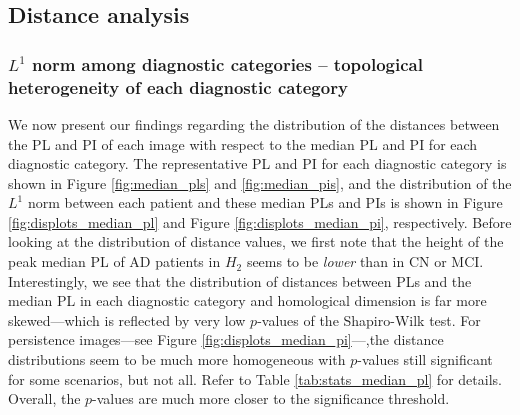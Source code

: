 \documentclass{article}
\begin{document}
\subsection{Distance analysis}

\subsubsection{$L^1$ norm among diagnostic categories -- topological
  heterogeneity of each diagnostic category}\label{sec:results_between_images}

We now present our findings regarding the distribution of the distances between the PL and PI of
each image with respect to the median PL and PI for each diagnostic category. The representative PL
and PI for each diagnostic category is shown in Figure \ref{fig:median_pls} and
\ref{fig:median_pis}, and the distribution of the $L^1$ norm between each patient and these median
PLs and PIs is shown in Figure \ref{fig:displots_median_pl} and Figure \ref{fig:displots_median_pi},
respectively. Before looking at the distribution of distance values, we first note that the height of the peak median PL of AD patients in
$H_2$ seems to be \emph{lower} than in CN or MCI. Interestingly, we see that the distribution of distances between PLs and the median PL
in each diagnostic category and homological dimension is far more skewed---which is reflected by very low
$p$-values of the Shapiro-Wilk test. For persistence images---see Figure \ref{fig:displots_median_pi}---,the distance distributions seem to be
much more homogeneous with $p$-values still significant for some scenarios, but not all. Refer to Table
\ref{tab:stats_median_pl} for details. Overall, the $p$-values are much more closer to the significance threshold.
\end{document}
